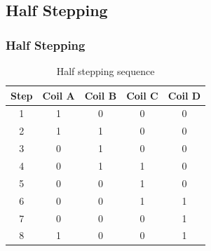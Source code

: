 \documentclass[table,10pt,red]{beamer}	%
\begin{document}
\subsection{Half Stepping}

\begin{frame}
	\frametitle{Half Stepping}
	\pause
	\begin{table}
		\begin{tabular}{c c c c c}
			\toprule
			\textbf{Step} & \textbf{Coil A} & \textbf{Coil B} & \textbf{Coil C} & \textbf{Coil D}\\
			\midrule
			1 & 1 & 0 & 0 & 0 \\
			2 & 1 & 1 & 0 & 0 \\
			3 & 0 & 1 & 0 & 0 \\
			4 & 0 & 1 & 1 & 0 \\
			5 & 0 & 0 & 1 & 0 \\
			6 & 0 & 0 & 1 & 1 \\
			7 & 0 & 0 & 0 & 1 \\
			8 & 1 & 0 & 0 & 1 \\
			\bottomrule
		\end{tabular}
		\caption{Half stepping sequence}
	\end{table}
\end{frame}
\end{document}

